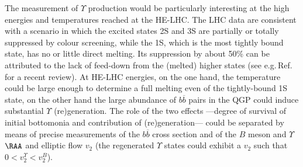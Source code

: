 \documentclass[../report.tex]{subfiles}
\begin{document}



The measurement of $\Upsilon$ production would be particularly interesting
at the high
energies and temperatures reached at the HE-LHC.
The LHC data are consistent with a scenario in which the excited
states 2S and 3S are partially or totally suppressed by colour
screening, while the 1S, which is the most tightly bound state, has no
or little direct melting. Its suppression by about 50\% can be
attributed to the lack of feed-down from the (melted) higher states
(see e.g.\,Ref.~\cite{Andronic:2015wma} for a recent review).
At HE-LHC energies, on the one hand, the temperature could be large
enough to determine a full melting even of the tightly-bound 1S state,
on the other hand the large abundance of $b\overline b$ pairs in the
QGP could induce substantial $\Upsilon$ (re)generation.
The role of the two effects ---degree of survival of initial bottomonia and contribution of
(re)generation--- could be separated by means of precise measurements of
the $b\overline b$ cross section
and of the $B$ meson and $\Upsilon$ $\RAA$ and elliptic flow $v_2$ 
(the regenerated $\Upsilon$ states could exhibit a $v_2$ such that $0<v_2^{\Upsilon}<v_2^B$).
\end{document}
